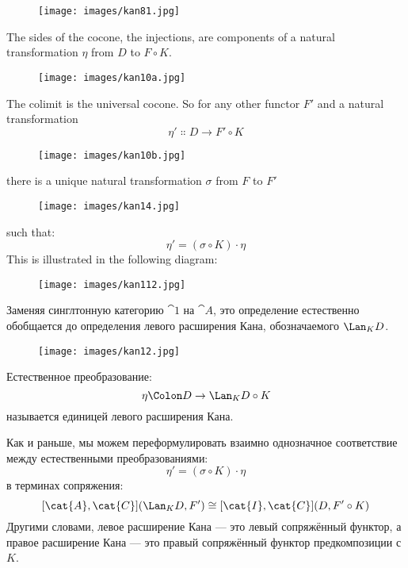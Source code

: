 \begin{figure}[H]
  \centering
  \texttt{[image: images/kan81.jpg]}
\end{figure}

\noindent
The sides of the cocone, the injections, are components of a natural
transformation $\eta$ from $D$ to $F \circ K$.

\begin{figure}[H]
  \centering
  \texttt{[image: images/kan10a.jpg]}
\end{figure}

\noindent
The colimit is the universal cocone. So for any other functor
$F'$ and a natural transformation
\[\eta' \Colon D \to F' \circ K\]

\begin{figure}[H]
  \centering
  \texttt{[image: images/kan10b.jpg]}
\end{figure}

\noindent
there is a unique natural transformation $\sigma$ from $F$ to $F'$

\begin{figure}[H]
  \centering
  \texttt{[image: images/kan14.jpg]}
\end{figure}

\noindent
such that:
\[\eta' = (\sigma \circ K) \cdot \eta\]
This is illustrated in the following diagram:

\begin{figure}[H]
  \centering
  \texttt{[image: images/kan112.jpg]}
\end{figure}

\noindent
Заменяя синглтонную категорию $\cat{1}$ на $\cat{A}$, это
определение естественно обобщается до определения левого расширения Кана,
обозначаемого $\Lan_{K}D$.

\begin{figure}[H]
  \centering
  \texttt{[image: images/kan12.jpg]}
\end{figure}

\noindent
Естественное преобразование:
\[\eta \Colon D \to \Lan_{K}D \circ K\]
называется единицей левого расширения Кана.

Как и раньше, мы можем переформулировать взаимно однозначное соответствие между естественными
преобразованиями:
\[\eta' = (\sigma \circ K) \cdot \eta\]
в терминах сопряжения:
\[[\cat{A}, \cat{C}](\Lan_{K}D, F') \cong [\cat{I}, \cat{C}](D, F' \circ K)\]
Другими словами, левое расширение Кана — это левый сопряжённый функтор, а
правое расширение Кана — это правый сопряжённый функтор предкомпозиции с
$K$.

